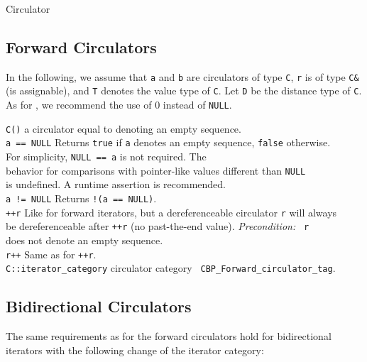 \begin{ccRefConcept}{Circulator}
\subsection*{Forward Circulators}

In the following, we assume that {\tt a} and {\tt b} are circulators
of type {\tt C}, {\tt r} is of type {\tt C\&} (is assignable), and
{\tt T} denotes the value type of {\tt C}.  Let {\tt D} be the
distance type of {\tt C}.  As for \CC, we recommend the use of 0
instead of {\tt NULL}.

\begin{tabbing}
    {\tt C()}         \> a circulator equal to  denoting an 
                         empty sequence.\\
    {\tt a == NULL}   \> Returns {\tt true} if {\tt a} denotes an empty
                         sequence, {\tt false} otherwise. \\
		      \> For simplicity, {\tt NULL == a} is not required. The\\
                      \> behavior for comparisons with pointer-like 
                         values different than {\tt NULL} \\
                      \> is undefined. A runtime assertion is 
                         recommended.\\
    {\tt a != NULL}   \> Returns {\tt !(a == NULL)}. \\
    {\tt ++r}         \> Like for forward iterators, but a dereferenceable
                         circulator {\tt r} will always\\
                      \> be dereferenceable after {\tt ++r} (no
                         past-the-end value). {\em Precondition:} {\tt
                           r} \\
                      \> does not denote an empty sequence.\\
    {\tt r++}         \> Same as for {\tt ++r}.\\
    {\tt C::iterator\_category} \>  circulator category {\tt 
                                      CBP\_Forward\_circulator\_tag}.
\end{tabbing}

\subsection*{Bidirectional Circulators}

The same requirements as for the forward circulators hold for
bidirectional iterators with the following change of the iterator
category:


\end{ccRefConcept}
